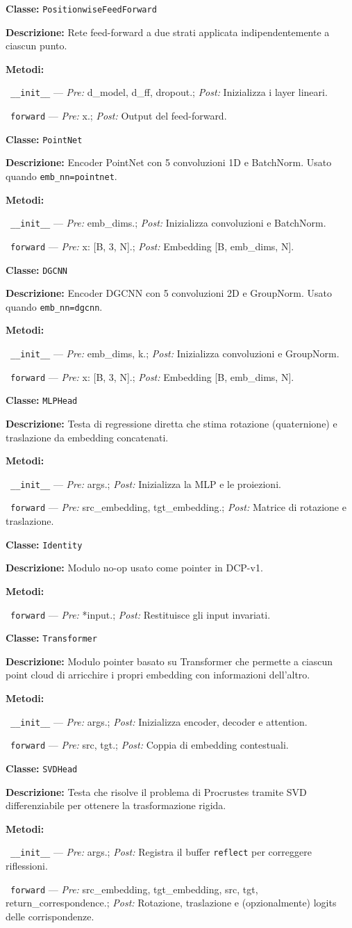 \documentclass[11pt,a4paper]{article}
\newenvironment{classspec}[2]{%
    \par\medskip\noindent
    \textbf{Classe:} \texttt{#1}\par
    \textbf{Descrizione:} #2\par
    \textbf{Metodi:}\par
    \begingroup
    \setlength{\parindent}{0pt}%
    \setlength{\parskip}{2pt}%
}{%
    \endgroup
    \par\medskip
}
\newcommand{\method}[3]{%
    \noindent\hspace*{1.2em}\textbullet~\texttt{#1} --- \textit{Pre:} #2; \textit{Post:} #3\par
}
\begin{document}
\begin{classspec}{PositionwiseFeedForward}{Rete feed-forward a due strati applicata indipendentemente a ciascun punto.}
\method{\_\_init\_\_}{d\_model, d\_ff, dropout.}{Inizializza i layer lineari.}
\method{forward}{x.}{Output del feed-forward.}
\end{classspec}

\begin{classspec}{PointNet}{Encoder PointNet con 5 convoluzioni 1D e BatchNorm. Usato quando \texttt{emb\_nn=pointnet}.}
\method{\_\_init\_\_}{emb\_dims.}{Inizializza convoluzioni e BatchNorm.}
\method{forward}{x: [B, 3, N].}{Embedding [B, emb\_dims, N].}
\end{classspec}

\begin{classspec}{DGCNN}{Encoder DGCNN con 5 convoluzioni 2D e GroupNorm. Usato quando \texttt{emb\_nn=dgcnn}.}
\method{\_\_init\_\_}{emb\_dims, k.}{Inizializza convoluzioni e GroupNorm.}
\method{forward}{x: [B, 3, N].}{Embedding [B, emb\_dims, N].}
\end{classspec}

\begin{classspec}{MLPHead}{Testa di regressione diretta che stima rotazione (quaternione) e traslazione da embedding concatenati.}
\method{\_\_init\_\_}{args.}{Inizializza la MLP e le proiezioni.}
\method{forward}{src\_embedding, tgt\_embedding.}{Matrice di rotazione e traslazione.}
\end{classspec}

\begin{classspec}{Identity}{Modulo no-op usato come pointer in DCP-v1.}
\method{forward}{*input.}{Restituisce gli input invariati.}
\end{classspec}

\begin{classspec}{Transformer}{Modulo pointer basato su Transformer che permette a ciascun point cloud di arricchire i propri embedding con informazioni dell'altro.}
\method{\_\_init\_\_}{args.}{Inizializza encoder, decoder e attention.}
\method{forward}{src, tgt.}{Coppia di embedding contestuali.}
\end{classspec}

\begin{classspec}{SVDHead}{Testa che risolve il problema di Procrustes tramite SVD differenziabile per ottenere la trasformazione rigida.}
\method{\_\_init\_\_}{args.}{Registra il buffer \texttt{reflect} per correggere riflessioni.}
\method{forward}{src\_embedding, tgt\_embedding, src, tgt, return\_correspondence.}{Rotazione, traslazione e (opzionalmente) logits delle corrispondenze.}
\end{classspec}
\end{document}
